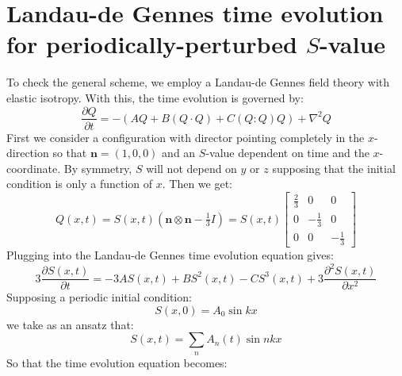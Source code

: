 \documentclass[reqno]{article}
\begin{document}
\section{Landau-de Gennes time evolution for periodically-perturbed $S$-value}

To check the general scheme, we employ a Landau-de Gennes field theory with elastic isotropy.
With this, the time evolution is governed by:
\begin{equation}
    \frac{\partial Q}{\partial t}
    =
    - \left( A Q + B (Q \cdot Q) + C (Q : Q) Q \right)
    + \nabla^2 Q
\end{equation}
First we consider a configuration with director pointing completely in the $x$-direction so that $\mathbf{n} = (1, 0, 0)$ and an $S$-value dependent on time and the $x$-coordinate.
By symmetry, $S$ will not depend on $y$ or $z$ supposing that the initial condition is only a function of $x$.
Then we get:
\begin{equation}
    Q(x, t)
    =
    S(x, t) \left( \mathbf{n} \otimes \mathbf{n} - \tfrac13 I \right)
    =
    S(x, t)
    \begin{bmatrix}
        \tfrac23 &0 &0 \\
        0 &-\tfrac13 &0 \\
        0 &0 &-\tfrac13
    \end{bmatrix}
\end{equation}
Plugging into the Landau-de Gennes time evolution equation gives:
\begin{equation}
    3 \frac{\partial S(x, t)}{\partial t} 
    =
    - 3 A S(x, t)
    + B S^2(x, t)
    - C S^3(x, t)
    + 3 \frac{\partial^2 S(x, t)}{\partial x^2}
\end{equation}
Supposing a periodic initial condition:
\begin{equation}
    S(x, 0)
    =
    A_0 \sin k x
\end{equation}
we take as an ansatz that:
\begin{equation}
    S(x, t)
    = \sum_n A_n (t) \sin nkx
\end{equation}
So that the time evolution equation becomes:
\end{document}
